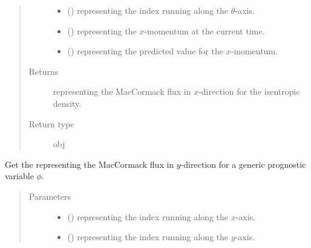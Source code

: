 \documentclass[letterpaper,10pt,english]{sphinxmanual}
\begin{document}
\begin{fulllineitems}
\begin{fulllineitems}
\begin{quote}
\begin{description}
\begin{itemize}
\item {} 
 () \textendash{}  representing the index running along the \(\theta\)-axis.

\item {} 
 () \textendash{}  representing the \(x\)-momentum at the current time.

\item {} 
 () \textendash{}  representing the predicted value for the \(x\)-momentum.

\end{itemize}

\item[{Returns}] \leavevmode
{} representing the MacCormack flux in \(x\)-direction for the isentropic density.

\item[{Return type}] \leavevmode
obj

\end{description}\end{quote}

\end{fulllineitems}


\begin{fulllineitems}
\label{\detokenize{api:dycore.flux_isentropic_maccormack.FluxIsentropicMacCormack._get_maccormack_flux_y}}
Get the  representing the MacCormack flux in \(y\)-direction for a
generic prognostic variable \(\phi\).
\begin{quote}\begin{description}
\item[{Parameters}] \leavevmode\begin{itemize}
\item {} 
 () \textendash{}  representing the index running along the \(x\)-axis.

\item {} 
 () \textendash{}  representing the index running along the \(y\)-axis.


\end{itemize}
\end{description}
\end{quote}
\end{fulllineitems}
\end{fulllineitems}
\end{document}
